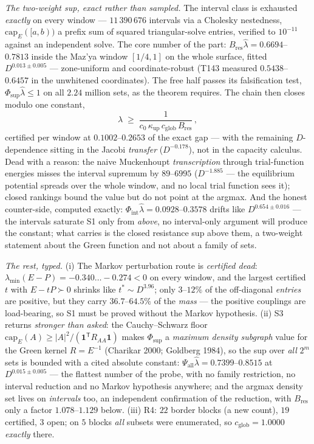 \documentclass[11pt,a4paper]{article}
\begin{document}
\emph{The two-weight sup, exact rather than sampled.} The interval class is exhausted
\emph{exactly} on every window --- $11\,390\,676$ intervals via a Cholesky nestedness,
$\mathrm{cap}_E([a,b))$ a prefix sum of squared triangular-solve entries, verified to
$10^{-11}$ against an independent solve. The core number of the part:
$B_{\mathrm{res}}\hat\lambda=0.6694$--$0.7813$ inside the Maz'ya window $[1/4,1]$ on the whole
surface, fitted $D^{0.013\pm0.005}$ --- zone-uniform and coordinate-robust (T143 measured
$0.5438$--$0.6457$ in the unwhitened coordinates). The free half passes its falsification test,
$\Phi_{\sup}\hat\lambda\le1$ on all $2.24$ million sets, as the theorem requires. The chain
then closes modulo one constant,
\[
\lambda \;\ge\; \frac{1}{c_0\,\kappa_{\mathrm{up}}\,c_{\mathrm{glob}}\,B_{\mathrm{res}}}\,,
\]
certified per window at $0.1002$--$0.2653$ of the exact gap --- with the remaining
$D$-dependence sitting in the Jacobi \emph{transfer} ($D^{-0.178}$), not in the capacity
calculus. Dead with a reason: the naive Muckenhoupt \emph{transcription} through trial-function
energies misses the interval supremum by $89$--$6995$ ($D^{-1.885}$ --- the equilibrium
potential spreads over the whole window, and no local trial function sees it); closed rankings
bound the value but do not point at the argmax. And the honest counter-side, computed exactly:
$\Phi_{\mathrm{int}}\hat\lambda=0.0928$--$0.3578$ drifts like $D^{0.654\pm0.016}$ --- the
intervals saturate S1 only from \emph{above}, no interval-only argument will produce the
constant; what carries is the closed resistance sup above them, a two-weight statement about
the Green function and not about a family of sets.

\emph{The rest, typed.} (i) The Markov perturbation route is \emph{certified dead}:
$\lambda_{\min}(E-P)=-0.340\ldots-0.274<0$ on every window, and the largest certified $t$ with
$E-tP\succ0$ shrinks like $t^*\sim D^{3.96}$; only $3$--$12\%$ of the off-diagonal
\emph{entries} are positive, but they carry $36.7$--$64.5\%$ of the \emph{mass} --- the
positive couplings are load-bearing, so S1 must be proved without the Markov hypothesis.
(ii) S3 returns \emph{stronger than asked}: the Cauchy--Schwarz floor
$\mathrm{cap}_E(A)\ge|A|^2/(\mathbf 1^{\mathsf T}R_{AA}\mathbf 1)$ makes $\Phi_{\sup}$ a
\emph{maximum density subgraph} value for the Green kernel $R=E^{-1}$ (Charikar 2000; Goldberg
1984), so the sup over \emph{all} $2^m$ sets is bounded with a cited absolute constant:
$\Psi_{\mathrm{all}}\hat\lambda=0.7399$--$0.8515$ at $D^{0.015\pm0.005}$ --- the flattest
number of the probe, with no family restriction, no interval reduction and no Markov hypothesis
anywhere; and the argmax density set lives on \emph{intervals} too, an independent confirmation
of the reduction, with $B_{\mathrm{res}}$ only a factor $1.078$--$1.129$ below.
(iii) R4: $22$ border blocks (a new count), $19$ certified, $3$ open; on $5$ blocks \emph{all}
subsets were enumerated, so $c_{\mathrm{glob}}=1.0000$ \emph{exactly} there.
\end{document}

